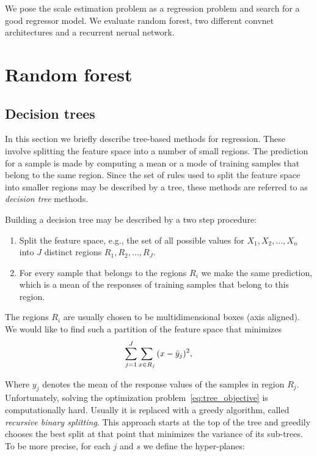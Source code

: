 We pose the scale estimation problem as a regression problem and
search for a good regressor model.  We evaluate random forest, two
different convnet architectures and a recurrent nerual network.

\section{Random forest}

\subsection{Decision trees}

In this section we briefly describe tree-based methods for regression.
These involve splitting the feature space into a number of small
regions.  The prediction for a sample is made by computing a mean or a
mode of training samples that belong to the same region.  Since the
set of rules used to split the feature space into smaller regions may
be described by a tree, these methods are referred to as
\textit{decision tree} methods.

Building a decision tree may be described by a two step procedure:
\begin{enumerate}
\item Split the feature space, e.g., the set of all possible values
  for $X_1, X_2,\ldots,X_n$ into $J$ distinct regions $R_1, R_2,\ldots, R_J$.
\item For every sample that belongs to the regions $R_i$ we make the
  same prediction, which is a mean of the responses of training
  samples that belong to this region.
\end{enumerate}

The regions $R_i$ are usually chosen to be multidimensional boxes
(axis aligned).  We would like to find such a partition of the feature
space that minimizes
\begin{equation}\label{eq:tree_objective}
\sum\limits_{j=1}^J\sum_{x\in R_j}{(x-\bar{y}_j)^2},
\end{equation}

Where $y_j$ denotes the mean of the response values of the samples in
region $R_j$.  Unfortunately, solving the optimization
problem~\ref{eq:tree_objective} is computationally hard.  Usually it
is replaced with a greedy algorithm, called \textit{recursive binary
  splitting}.  This approach starts at the top of the tree and
greedily chooses the best split at that point that minimizes the
variance of its sub-trees.  To be more precise, for each $j$ and $s$
we define the hyper-planes:

